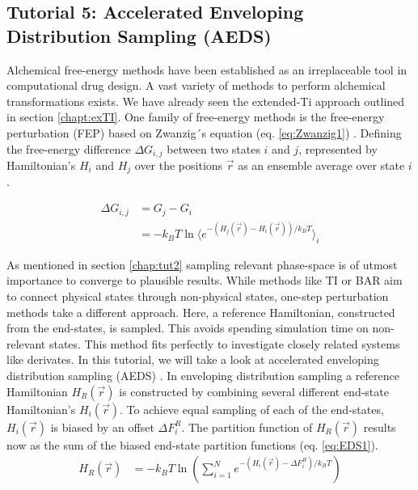 
\subsection{Tutorial 5: Accelerated Enveloping Distribution Sampling (AEDS)}

Alchemical free-energy methods have been established as an irreplaceable tool in computational drug design. A vast variety of methods to perform alchemical transformations exists. We have already seen the extended-Ti approach outlined in section \ref{chapt:exTI}. One family of free-energy methods is the free-energy perturbation (FEP) based on Zwanzig´s equation (eq. \ref{eq:Zwanzig1}) \cite{Zwanzig1954}. Defining the free-energy difference $\Delta G_{i,j}$ between two states $i$ and $j$, represented by Hamiltonian's $H_i$ and $H_j$ over the positions $\vec{r}$ as an ensemble average over state $i$. 

\begin{equation}
\begin{aligned}
\Delta G_{i,j} & = G_j - G_i \\ & = -k_BT \ln  \Biggl \langle e^{ -(H_j(\vec{r}) - H_i(\vec{r}))/k_BT} \biggr \rangle_i 
\end{aligned}
\label{eq:Zwanzig1}
\end{equation}

As mentioned in section \ref{chap:tut2} sampling relevant phase-space is of utmost importance to converge to plausible results. While methods like TI \cite{kirkwood_TI} or BAR \cite{bar} aim to connect physical states through non-physical states, one-step perturbation methods take a different approach. Here, a reference Hamiltonian, constructed from the end-states, is sampled. This avoids spending simulation time on non-relevant states. This method fits perfectly to investigate closely related systems like derivates. In this tutorial, we will take a look at accelerated enveloping distribution sampling (AEDS) \cite{JP2018,JP2020}. In enveloping distribution sampling a reference Hamiltonian $H_R(\vec{r})$ is constructed by combining several different end-state Hamiltonian's $H_i(\vec{r})$. To achieve equal sampling of each of the end-states, $H_i(\vec{r})$ is biased by an offset $\Delta F_{i}^R$. The partition function of $H_R(\vec{r})$ results now as the sum of the biased end-state partition functions (eq. \ref{eq:EDS1}).
\begin{equation}
\begin{aligned}
H_R(\vec{r}) & = -k_BT \ln  \left( \sum_{i=1}^{N} e^{ -(H_i(\vec{r}) - \Delta F_{i}^R)/k_BT} \right) 
\end{aligned}
\label{eq:EDS1}
\end{equation}


